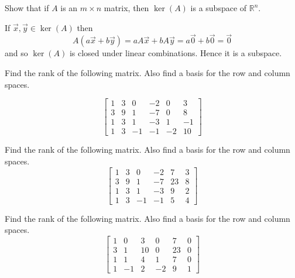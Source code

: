\documentclass{ximera}
\begin{document}
\begin{problem}\label{prb:5.31} Show that if $A$ is an $m\times n$ matrix, then $\ker \left( A\right) $
is a subspace of $\mathbb{R}^n$.
\begin{hint}
If $\vec{x},\vec{y}\in \ker \left( A\right) $ then
\[
A\left( a\vec{x}+b\vec{y}\right) =aA\vec{x}+bA\vec{y}=a\vec{0}
+b\vec{0}=\vec{0}
\]
and so $\ker \left( A\right) $ is closed under linear combinations. Hence it
is a subspace.
\end{hint}
\end{problem}

\begin{problem}\label{prb:5.32} Find the rank of the following matrix. Also find a basis for the row
and column spaces.

\begin{equation*}
\left[
\begin{array}{rrrrrr}
1 & 3 & 0 & -2 & 0 & 3 \\
3 & 9 & 1 & -7 & 0 & 8 \\
1 & 3 & 1 & -3 & 1 & -1 \\
1 & 3 & -1 & -1 & -2 & 10
\end{array}
\right]
\end{equation*}
\end{problem}

\begin{problem}\label{prb:5.33} Find the rank of the following matrix. Also find a basis for the row
and column spaces.
\begin{equation*}
\left[
\begin{array}{rrrrrr}
1 & 3 & 0 & -2 & 7 & 3 \\
3 & 9 & 1 & -7 & 23 & 8 \\
1 & 3 & 1 & -3 & 9 & 2 \\
1 & 3 & -1 & -1 & 5 & 4
\end{array}
\right]
\end{equation*}
\end{problem}

\begin{problem}\label{prb:5.34} Find the rank of the following matrix. Also find a basis for the row
and column spaces.
\begin{equation*}
\left[
\begin{array}{rrrrrr}
1 & 0 & 3 & 0 & 7 & 0 \\
3 & 1 & 10 & 0 & 23 & 0 \\
1 & 1 & 4 & 1 & 7 & 0 \\
1 & -1 & 2 & -2 & 9 & 1
\end{array}
\right]
\end{equation*}
\end{problem}
\end{document}
